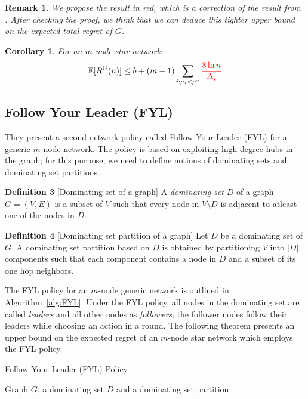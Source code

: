 \documentclass{article}
\newtheorem{corollary}{Corollary}
\newtheorem{remark}{Remark}
\begin{document}
\begin{remark}
  We propose the result in red, which is a correction of the result from \cite{DBLP:journals/corr/KollaJG16}. After checking the proof, we think that we can deduce this tighter upper bound on the expected total regret of $G$.
\end{remark}

\begin{corollary}
  \label{cor:star}
  For an $m$-node star network:
  \begin{equation}
    \mathbb{E}[R^G(n)] \leq b + (m - 1) \sum\limits_{i:\mu_i < \mu^*} {\color{red} \frac{8 \ln n}{\Delta_i}}
  \end{equation}
\end{corollary}

\subsection{Follow Your Leader (FYL)}
They present a second network policy called Follow Your Leader (FYL) for a generic $m$-node network. The policy is based on exploiting high-degree hubs in the graph; for this purpose, we need to define notions of dominating sets and dominating set partitions.

\textbf{Definition 3} [Dominating set of a graph] A \textit{dominating set} $D$ of a graph $G = (V,E)$ is a subset of $V$ such that every node in $V\setminus D$ is adjacent to atleast one of the nodes in $D$.

\textbf{Definition 4} [Dominating set partition of a graph]
Let $D$ be a dominating set of $G$. A dominating set partition based on $D$ is obtained by partitioning $V$ into $|D|$ components such that each component contains a node in $D$ and a subset of its one hop neighbors.

The FYL policy for an $m$-node generic network is outlined in Algorithm~\ref{alg:FYL}. Under the FYL policy, all nodes in the dominating set are called {\em leaders} and all other nodes as {\em followers}; the follower nodes follow their leaders while choosing an action in a round.
The following theorem presents an upper bound on the expected regret of an $m$-node star network which employs the FYL policy.

\begin{algorithm}[htb]
   \caption{Follow Your Leader (FYL) Policy}
   \label{alg:FYL}
   \begin{algorithmic}
      Graph $G$, a dominating set $D$ and a dominating set partition
  \end{algorithmic}
\end{algorithm}
\end{document}
